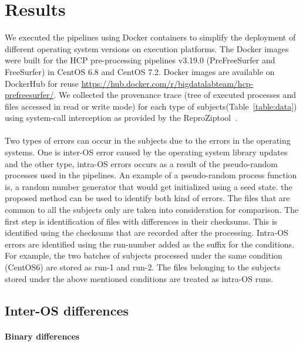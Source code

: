 \documentclass{article}
\newcommand{\reprozip}[0]{ReproZip}
\begin{document}
{\section{Results}

We executed the pipelines using Docker containers to simplify the 
deployment of different operating system versions on execution 
platforms. The Docker images were built for the HCP pre-processing 
pipelines v3.19.0 (PreFreeSurfer and FreeSurfer) in 
CentOS 6.8 and CentOS 7.2. Docker images are available on DockerHub for 
reuse \url{https://hub.docker.com/r/bigdatalabteam/hcp-prefreesurfer/}. 
We collected the provenance trace (tree of executed processes and files 
accessed in read or write mode) for each type of 
subjects(Table~\ref{table:data}) using system-call interception as 
provided by the \reprozip tool~\cite{Chirigati2016}.

\paragraph{} Two types of errors can occur in the subjects due to the 
errors in the operating systems. One is inter-OS error caused by the 
operating system library updates and the other type, intra-OS errors 
occurs as a result of the pseudo-random processes used in the 
pipelines. An example of a pseudo-random process function is, a random 
number generator that would get initialized using a seed state. the 
proposed method can be used to identify both kind of errors. The files 
that are common to all the subjects only are taken into consideration 
for comparison. The first step is identification of files with 
differences in their checksums. This is identified using the checksums 
that are recorded after the processing. Intra-OS errors are identified 
using the run-number added as the suffix for the conditions. For 
example, the two batches of subjects processed under the same condition 
(CentOS6) are stored as run-1 and run-2. The files belonging to the 
subjects stored under the above mentioned conditions are treated as 
intra-OS runs.

\subsection{Inter-OS differences}


\paragraph{Binary differences}

}
\end{document}
